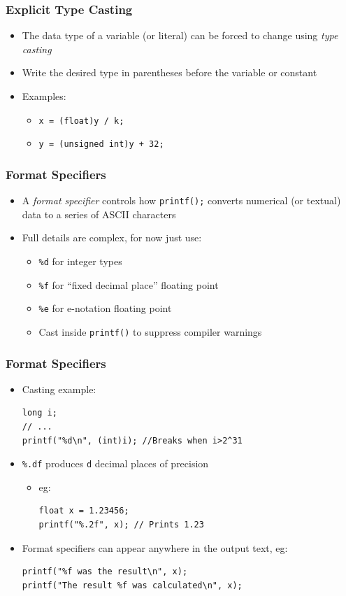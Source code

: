 \documentclass[14pt]{beamer}
\begin{document}
\begin{frame}
\frametitle{Explicit Type Casting}
\begin{itemize}
\item The data type of a variable (or literal) can be forced to change using \textit{type casting}
\item Write the desired type in parentheses before the variable or constant
\item Examples:
	\begin{itemize}
		\item \texttt{x = (float)y / k;}
		\item \texttt{y = (unsigned int)y + 32;}
	\end{itemize}
\end{itemize}
\end{frame}

\begin{frame}
\frametitle{Format Specifiers}
\begin{itemize}
\item A \textit{format specifier} controls how \texttt{printf();} converts numerical (or textual) data to a series of ASCII characters
\item Full details are complex, for now just use:
	\begin{itemize}
		\item \texttt{\%d} for integer types
		\item \texttt{\%f} for ``fixed decimal place'' floating point
		\item \texttt{\%e} for e-notation floating point
		\item Cast inside \texttt{printf()} to suppress compiler warnings
	\end{itemize}	 
\end{itemize}
\end{frame}

\begin{frame}[fragile]
\frametitle{Format Specifiers}
\begin{itemize}
\item Casting example:
\begin{lstlisting}[style=CStyle]
long i;
// ...
printf("%d\n", (int)i); //Breaks when i>2^31
\end{lstlisting}
\item \texttt{\%.df} produces \texttt{d} decimal places of precision
	\begin{itemize}
		\item eg: \\
		\begin{lstlisting}[style=CStyle]
float x = 1.23456;
printf("%.2f", x); // Prints 1.23
\end{lstlisting}
	\end{itemize}

\item Format specifiers can appear anywhere in the output text, eg:
\begin{lstlisting}[style=CStyle]
printf("%f was the result\n", x);
printf("The result %f was calculated\n", x);
\end{lstlisting}
\end{itemize}
\end{frame}
\end{document}
